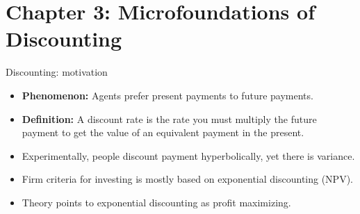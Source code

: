 \documentclass{beamer}
\newcommand{\flabel}[1]{\label{fig:#1}}
\numberwithin{equation}{section}
\begin{document}

\section{Chapter 3: Microfoundations of Discounting}
\begin{frame}{Discounting: motivation}
\begin{itemize}
    \item \textbf{Phenomenon:} Agents prefer present payments to future payments. 
    \item \textbf{Definition:} A discount rate is the rate you must multiply the future payment to get the value of an equivalent payment in the present.
    \item Experimentally, people discount payment hyperbolically, yet there is variance.
    \item Firm criteria for investing is mostly based on exponential discounting (NPV).
    \item Theory points to exponential discounting as profit maximizing.
\end{itemize}
\end{frame}
\end{document}
